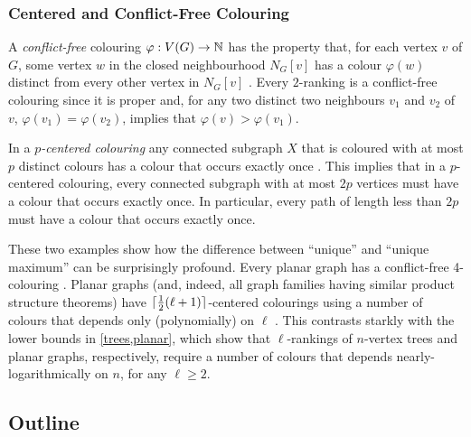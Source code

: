 \documentclass[kpfonts]{patmorin}
\theoremstyle{named}
\begin{document}
\subsubsection{Centered and Conflict-Free Colouring}



A \emph{conflict-free} colouring $\varphi:V(G)\to\mathbb{N}$ has the property that, for each vertex $v$ of $G$, some vertex $w$ in the closed neighbourhood $N_G[v]$ has a colour $\varphi(w)$ distinct from every other vertex in $N_G[v]$ \cite{pach.tardos:conflict-free,glebov.szabo.ea:conflict-free,gargano.rescigno:complexity}. Every $2$-ranking is a conflict-free colouring since it is proper and, for any two distinct two neighbours $v_1$ and $v_2$ of $v$, $\varphi(v_1)=\varphi(v_2)$, implies that $\varphi(v)>\varphi(v_1)$.


In a \emph{$p$-centered colouring} any connected subgraph $X$ that is coloured with at most $p$ distinct colours has a colour that occurs exactly once \cite{nesetril.ossona:tree-depth,nesetril.ossona:grad,zhu:colouring}.  This implies that in a $p$-centered colouring, every connected subgraph with at most $2p$ vertices must have a colour that occurs exactly once.  In particular, every path of length less than $2p$ must have a colour that occurs exactly once.

These two examples show how the difference between ``unique'' and ``unique maximum'' can be surprisingly profound.  Every planar graph has a conflict-free 4-colouring \cite{abel.alvarez.ea:conflict-free}. Planar graphs (and, indeed, all graph families having similar product structure theorems) have ${\lceil \tfrac12(\ell+1) \rceil}$-centered colourings using a number of colours that depends only (polynomially) on $\ell$ \cite{nesetril.ossona:grad,debski.felsner.ea:improved,pilipczuk.siebertz:polynomial}.  This contrasts starkly with the lower bounds in \cref{trees,planar}, which show that $\ell$-rankings of $n$-vertex trees and planar graphs, respectively, require a number of colours that depends nearly-logarithmically on $n$, for any $\ell\ge 2$.

\subsection{Outline}
\end{document}
